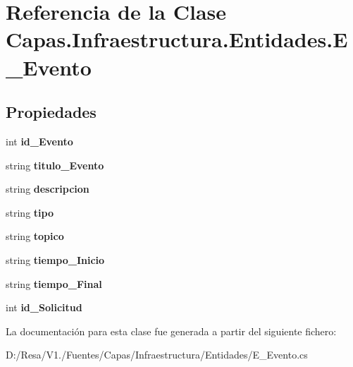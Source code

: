 \section{Referencia de la Clase Capas.\+Infraestructura.\+Entidades.\+E\+\_\+\+Evento}
\label{class_capas_1_1_infraestructura_1_1_entidades_1_1_e___evento}
\subsection*{Propiedades}
\begin{DoxyCompactItemize}
\item 
int {\bfseries id\+\_\+\+Evento}\hspace{0.3cm}{\ttfamily  [get, set]}\label{class_capas_1_1_infraestructura_1_1_entidades_1_1_e___evento_a926a1619e4f9300f695a0023523ded97}

\item 
string {\bfseries titulo\+\_\+\+Evento}\hspace{0.3cm}{\ttfamily  [get, set]}\label{class_capas_1_1_infraestructura_1_1_entidades_1_1_e___evento_a51bc42d45863e16a6f9ee5d5f2b34aa5}

\item 
string {\bfseries descripcion}\hspace{0.3cm}{\ttfamily  [get, set]}\label{class_capas_1_1_infraestructura_1_1_entidades_1_1_e___evento_aeb728b8c7b6022c86699f539bc338365}

\item 
string {\bfseries tipo}\hspace{0.3cm}{\ttfamily  [get, set]}\label{class_capas_1_1_infraestructura_1_1_entidades_1_1_e___evento_a01f93c742aa031a0edf9329e3fb334c1}

\item 
string {\bfseries topico}\hspace{0.3cm}{\ttfamily  [get, set]}\label{class_capas_1_1_infraestructura_1_1_entidades_1_1_e___evento_a043a23e5ace55362d192dc4ad3654c80}

\item 
string {\bfseries tiempo\+\_\+\+Inicio}\hspace{0.3cm}{\ttfamily  [get, set]}\label{class_capas_1_1_infraestructura_1_1_entidades_1_1_e___evento_a4822c32a2e8271e90f4438a36368a0ee}

\item 
string {\bfseries tiempo\+\_\+\+Final}\hspace{0.3cm}{\ttfamily  [get, set]}\label{class_capas_1_1_infraestructura_1_1_entidades_1_1_e___evento_abf56549093d706b22777209065e4818a}

\item 
int {\bfseries id\+\_\+\+Solicitud}\hspace{0.3cm}{\ttfamily  [get, set]}\label{class_capas_1_1_infraestructura_1_1_entidades_1_1_e___evento_a8e3772c19534b423e46803561b531fb9}

\end{DoxyCompactItemize}


La documentación para esta clase fue generada a partir del siguiente fichero\+:\begin{DoxyCompactItemize}
\item 
D\+:/\+Resa/\+V1./\+Fuentes/\+Capas/\+Infraestructura/\+Entidades/E\+\_\+\+Evento.\+cs\end{DoxyCompactItemize}
